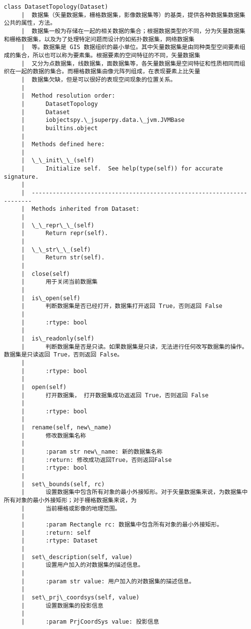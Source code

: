\documentclass[11pt]{article}
\begin{document}
\begin{Verbatim}[commandchars=\\\{\}]
    class DatasetTopology(Dataset)
     |  数据集（矢量数据集，栅格数据集，影像数据集等）的基类，提供各种数据集数据集公共的属性，方法。
     |  数据集一般为存储在一起的相关数据的集合；根据数据类型的不同，分为矢量数据集和栅格数据集，以及为了处理特定问题而设计的如拓扑数据集，网络数据集
     |  等。数据集是 GIS 数据组织的最小单位。其中矢量数据集是由同种类型空间要素组成的集合，所以也可以称为要素集。根据要素的空间特征的不同，矢量数据集
     |  又分为点数据集，线数据集，面数据集等，各矢量数据集是空间特征和性质相同而组织在一起的数据的集合。而栅格数据集由像元阵列组成，在表现要素上比矢量
     |  数据集欠缺，但是可以很好的表现空间现象的位置关系。
     |  
     |  Method resolution order:
     |      DatasetTopology
     |      Dataset
     |      iobjectspy.\_jsuperpy.data.\_jvm.JVMBase
     |      builtins.object
     |  
     |  Methods defined here:
     |  
     |  \_\_init\_\_(self)
     |      Initialize self.  See help(type(self)) for accurate signature.
     |  
     |  ----------------------------------------------------------------------
     |  Methods inherited from Dataset:
     |  
     |  \_\_repr\_\_(self)
     |      Return repr(self).
     |  
     |  \_\_str\_\_(self)
     |      Return str(self).
     |  
     |  close(self)
     |      用于关闭当前数据集
     |  
     |  is\_open(self)
     |      判断数据集是否已经打开，数据集打开返回 True，否则返回 False
     |      
     |      :rtype: bool
     |  
     |  is\_readonly(self)
     |      判断数据集是否是只读。如果数据集是只读，无法进行任何改写数据集的操作。 数据集是只读返回 True，否则返回 False。
     |      
     |      :rtype: bool
     |  
     |  open(self)
     |      打开数据集， 打开数据集成功返返回 True，否则返回 False
     |      
     |      :rtype: bool
     |  
     |  rename(self, new\_name)
     |      修改数据集名称
     |      
     |      :param str new\_name: 新的数据集名称
     |      :return: 修改成功返回True，否则返回False
     |      :rtype: bool
     |  
     |  set\_bounds(self, rc)
     |      设置数据集中包含所有对象的最小外接矩形。对于矢量数据集来说，为数据集中所有对象的最小外接矩形；对于栅格数据集来说，为
     |      当前栅格或影像的地理范围。
     |      
     |      :param Rectangle rc: 数据集中包含所有对象的最小外接矩形。
     |      :return: self
     |      :rtype: Dataset
     |  
     |  set\_description(self, value)
     |      设置用户加入的对数据集的描述信息。
     |      
     |      :param str value: 用户加入的对数据集的描述信息。
     |  
     |  set\_prj\_coordsys(self, value)
     |      设置数据集的投影信息
     |      
     |      :param PrjCoordSys value: 投影信息

\end{Verbatim}
\end{document}
